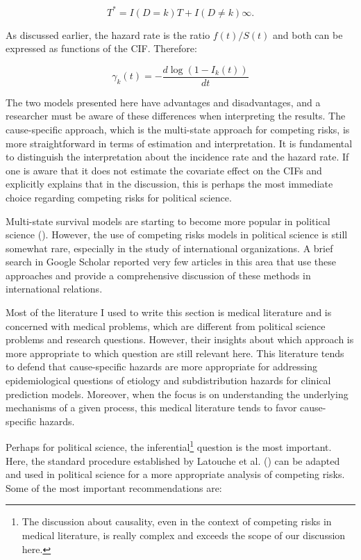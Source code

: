 \documentclass[12pt]{article}
\begin{document}
\begin{equation}
T^* = I(D = k)T + I(D \neq k)\infty.
\end{equation}

As discussed earlier, the hazard rate is the ratio \( f(t) / S(t) \) and both can be expressed as functions of the CIF. Therefore:

\begin{equation}
\gamma_k(t) = -\frac{d \log(1 - I_k(t))}{dt}
\end{equation}

The two models presented here have advantages and disadvantages, and a researcher must be aware of these differences when interpreting the results. The cause-specific approach, which is the multi-state approach for competing risks, is more straightforward in terms of estimation and interpretation. It is fundamental to distinguish the interpretation about the incidence rate and the hazard rate. If one is aware that it does not estimate the covariate effect on the CIFs and explicitly explains that in the discussion, this is perhaps the most immediate choice regarding competing risks for political science.

Multi-state survival models are starting to become more popular in political science (\cite{metzger2016surviving}). However, the use of competing risks models in political science is still somewhat rare, especially in the study of international organizations. A brief search in Google Scholar reported very few articles in this area that use these approaches and provide a comprehensive discussion of these methods in international relations.

Most of the literature I used to write this section is medical literature and is concerned with medical problems, which are different from political science problems and research questions. However, their insights about which approach is more appropriate to which question are still relevant here. This literature tends to defend that cause-specific hazards are more appropriate for addressing epidemiological questions of etiology and subdistribution hazards for clinical prediction models. Moreover, when the focus is on understanding the underlying mechanisms of a given process, this medical literature tends to favor cause-specific hazards.

Perhaps for political science, the inferential\footnote{The discussion about causality, even in the context of competing risks in medical literature, is really complex and exceeds the scope of our discussion here.} question is the most important. Here, the standard procedure established by Latouche et al. (\citeyear{latouche2013competing}) can be adapted and used in political science for a more appropriate analysis of competing risks. Some of the most important recommendations are: 
\end{document}
